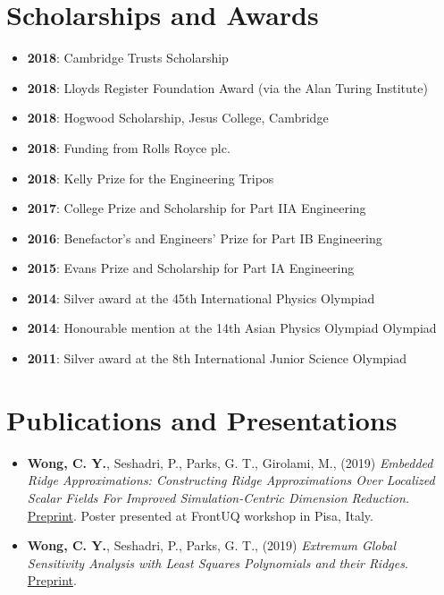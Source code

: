 \documentclass[letterpaper,11pt,oneside]{article}
\begin{document}
\section*{Scholarships and Awards}
\begin{itemize}
\item \textbf{2018}: Cambridge Trusts Scholarship 
\item \textbf{2018}: Lloyds Register Foundation Award (via the Alan Turing Institute)
\item \textbf{2018}: Hogwood Scholarship, Jesus College, Cambridge
\item \textbf{2018}: Funding from Rolls Royce plc. 
\item \textbf{2018}: Kelly Prize for the Engineering Tripos
\item \textbf{2017}: College Prize and Scholarship for Part IIA Engineering
\item \textbf{2016}: Benefactor’s and Engineers’ Prize for Part IB Engineering
\item \textbf{2015}: Evans Prize and Scholarship for Part IA Engineering
\item \textbf{2014}: Silver award at the 45th International Physics Olympiad
\item \textbf{2014}: Honourable mention at the 14th Asian Physics Olympiad Olympiad
\item \textbf{2011}: Silver award at the 8th International Junior Science Olympiad
\end{itemize}

\section*{Publications and Presentations}
\begin{itemize}
\item \textbf{Wong, C. Y.}, Seshadri, P., Parks, G. T., Girolami, M., (2019) \emph{Embedded Ridge Approximations: Constructing Ridge Approximations Over Localized Scalar Fields For Improved Simulation-Centric Dimension Reduction.} \href{https://arxiv.org/abs/1907.07037}{Preprint}. Poster presented at FrontUQ workshop in Pisa, Italy.
\item \textbf{Wong, C. Y.}, Seshadri, P., Parks, G. T., (2019) \emph{Extremum Global Sensitivity Analysis with Least Squares Polynomials and their Ridges}. \href{https://arxiv.org/abs/1907.08113}{Preprint}.
\end{itemize}
\end{document}
